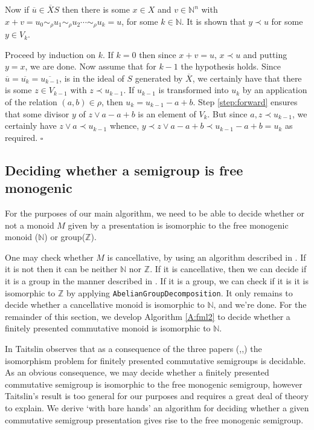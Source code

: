 \documentclass{acmconf}
\begin{document}
Now if $\overline{u} \in \overline{X}S$ then there is some
$x \in X$ and $v \in \mathbb{N}^n$ with
$x + v = u_0 \sim_\rho u_1 \sim_\rho u_2 \cdots \sim_\rho u_k = u$, for
some $k \in \mathbb{N}$. It is shown that $y \prec u$ for some
$y \in V_k$. 

Proceed by induction on $k$. If $k = 0$ then since
$x + v = u$, $x \prec u$ and putting $y = x$, we are done.
Now assume that for $k - 1$ the hypothesis holds.
Since $\overline{u} = \overline{u_k} = \overline{u_{k-1}}$,
is in the ideal of $S$ generated by $\overline{X}$, we certainly have
that there is some $z \in V_{k-1}$ with $z \prec u_{k-1}$.
If $u_{k-1}$ is transformed into $u_k$ by an application of the
relation $(a,b) \in \rho$, then $u_k = u_{k-1} - a + b$.
Step \ref{step:forward} ensures that  some divisor $y$ of  
$z \vee a -a + b$ is an element of $V_k$.
But since $a,z \prec  u_{k-1}$, we certainly have 
$z \vee a \prec u_{k-1}$ whence, 
$y \prec z \vee a -a + b \prec u_{k-1} - a + b = u_k$
as required. $\square$



\subsection{Deciding whether a semigroup is free monogenic}\label{s:freemon}
For the purposes of our main algorithm, we need to 
be able to decide whether or not a monoid $M$ given by 
a presentation is isomorphic to the free monogenic monoid
($\mathbb{N}$) or group($\mathbb{Z}$). 

One may check whether $M$ is cancellative,
by using an algorithm described in \cite[Chapter 8]{bRG99}.
If it is not then it can be neither $\mathbb{N}$
nor $\mathbb{Z}$. If it is cancellative, then 
we can decide if it is a group in the manner described in 
\cite{bRG99}. If it is a group, we can check if it is 
it is isomorphic to $\mathbb{Z}$ by applying {\tt AbelianGroupDecomposition}.
It only remains to decide whether a cancellative monoid is 
isomorphic to $\mathbb{N}$, and we're done.
For the remainder of this section, we develop
Algorithm \ref{A:fml2} to decide whether  a finitely presented 
commutative monoid  is  isomorphic to $\mathbb{N}$.

In \cite{taitslin} Taitslin observes that as a consequence of the 
three papers (\cite{p1},\cite{p2},\cite{p3}) the isomorphism problem
for finitely presented commutative semigroups is decidable. As an
obvious consequence, we may decide whether a finitely presented commutative
semigroup is isomorphic to the free monogenic semigroup, however 
Taitslin's result is too general 
for our purposes and requires a great 
deal of theory to explain.  We derive `with bare hands'
an algorithm for deciding whether a given commutative semigroup 
presentation gives rise  to the free monogenic semigroup.
\end{document}
